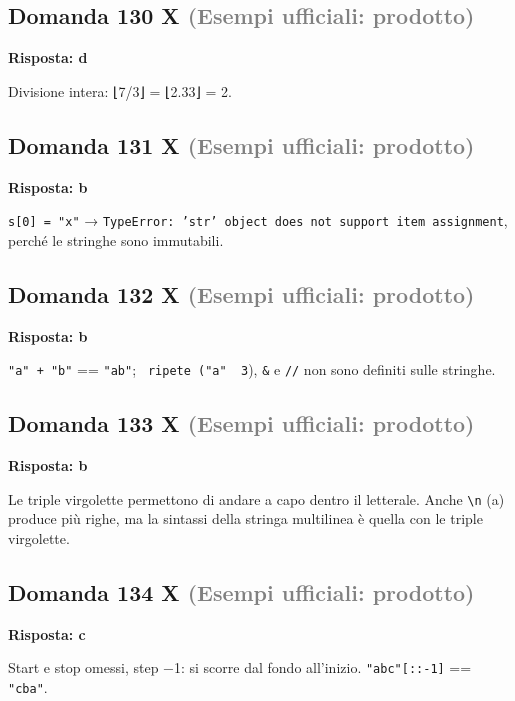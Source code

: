 \documentclass[a4paper,11pt]{article}
\begin{document}
\subsection*{Domanda 130 X \hfill {\small \textcolor{gray}{(Esempi ufficiali: prodotto)}}}
\textbf{Risposta: d}\par
Divisione intera: ⌊7/3⌋ = ⌊2.33⌋ = 2.



\subsection*{Domanda 131 X \hfill {\small \textcolor{gray}{(Esempi ufficiali: prodotto)}}}
\textbf{Risposta: b}\par
\texttt{s[0] = "x"} → \texttt{TypeError: 'str' object does not support item assignment}, perché le stringhe sono immutabili.



\subsection*{Domanda 132 X \hfill {\small \textcolor{gray}{(Esempi ufficiali: prodotto)}}}
\textbf{Risposta: b}\par
\texttt{"a" + "b"} == \texttt{"ab"}; \texttt{\textit{} ripete (\texttt{"a" } 3}), \texttt{\&} e \texttt{//} non sono definiti sulle stringhe.



\subsection*{Domanda 133 X \hfill {\small \textcolor{gray}{(Esempi ufficiali: prodotto)}}}
\textbf{Risposta: b}\par
Le triple virgolette permettono di andare a capo dentro il letterale. Anche \texttt{\textbackslash n} (a) produce più righe, ma la sintassi della stringa multilinea è quella con le triple virgolette.



\subsection*{Domanda 134 X \hfill {\small \textcolor{gray}{(Esempi ufficiali: prodotto)}}}
\textbf{Risposta: c}\par
Start e stop omessi, step −1: si scorre dal fondo all'inizio. \texttt{"abc"[::-1]} == \texttt{"cba"}.
\end{document}
